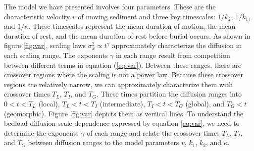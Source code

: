 \documentclass[]{agujournal2018}
\begin{document}
The model we have presented involves four parameters. These are the characteristic velocity $v$ of moving sediment and three key timescales: $1/k_2$, $1/k_1$, and $1/\kappa$.
These timescales represent the mean duration of motion, the mean duration of rest, and the mean duration of rest before burial occurs.
As shown in figure \ref{fig:var}, scaling laws $\sigma_x^2 \propto t^\gamma$ approximately characterize the diffusion in each scaling range.
The exponents $\gamma$ in each range result from competition between different terms in equation (\ref{eq:var}).
Between these ranges, there are crossover regions where the scaling is not a power law.
Because these crossover regions are relatively narrow, we can approximately characterize them with crossover times $T_L$, $T_I$, and $T_G$.
These times partition the diffusion ranges into $0< t < T_L$ (local), $T_L < t < T_I$ (intermediate), $T_I < t < T_G$ (global), and $T_G < t$ (geomorphic). 
Figure \ref{fig:var} depicts them as vertical lines.
To understand the bedload diffusion scale dependence expressed by equation \ref{eq:var}, we need to determine the exponents $\gamma$ of each range and relate the crossover times $T_L$, $T_I$, and $T_G$ between diffusion ranges to the model parameters $v$, $k_1$, $k_2$, and $\kappa$.
\end{document}
